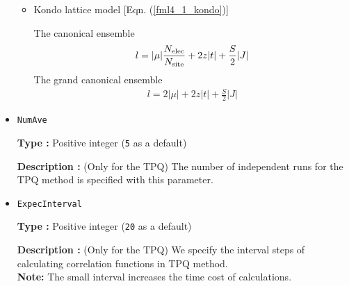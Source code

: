 \begin{itemize}
\begin{itemize}
\item Kondo lattice model [Eqn. (\ref{fml4_1_kondo})]

The canonical ensemble
\begin{align}
l = |\mu| \frac{N_{\rm elec}}{N_{\rm site}} + 2 z |t| + \frac{S}{2} |J| 
\end{align}
The grand canonical ensemble
\begin{align}
l = 2|\mu| + 2 z |t| + \frac{S}{2} |J| 
\end{align}

\end{itemize}

\item \verb|NumAve|

{\bf Type :} Positive integer (\verb|5| as a default)

{\bf Description :} (Only for the TPQ) The number of independent runs for the TPQ method is specified 
with this parameter.

\item \verb|ExpecInterval|

{\bf Type :} Positive integer (\verb|20| as a default)

{\bf Description :} (Only for the TPQ) 
We specify the interval steps of calculating correlation functions in TPQ method.\\ 
{\bf Note:} The small interval increases the time cost of calculations.

\end{itemize}


